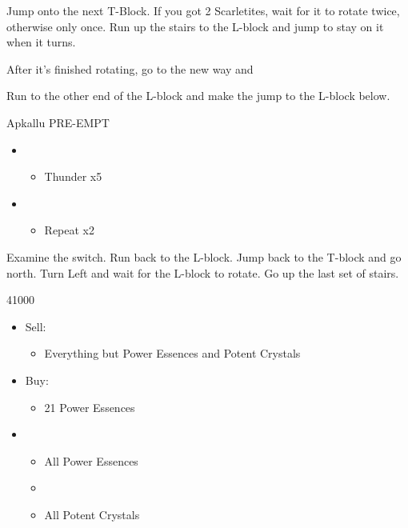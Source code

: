 Jump onto the next T-Block. If you got 2 Scarletites, wait for it to rotate twice, otherwise only once. Run up the stairs to the L-block and jump to stay on it when it turns.

After it's finished rotating, go to the new way and 

Run to the other end of the L-block and make the jump to the L-block below.

\begin{battle}{Apkallu PRE-EMPT}
	\begin{flushleft}
		\begin{itemize}
			\item \sixth
			      \begin{itemize}
				      \item Thunder x5
			      \end{itemize}
			\item \fifth
			      \begin{itemize}
				      \item Repeat x2
			      \end{itemize}
		\end{itemize}
	\end{flushleft}
\end{battle}

Examine the switch. Run back to the L-block. Jump back to the T-block and go north. Turn Left and wait for the L-block to rotate. Go up the last set of stairs.

\begin{shop}{41000}
	\begin{itemize}
		\item Sell:
		      \begin{itemize}
			      \item Everything but Power Essences and Potent Crystals
		      \end{itemize}
		\item Buy:
		      \begin{itemize}
			      \item 21 Power Essences
		      \end{itemize}
	\end{itemize}
\end{shop}
\begin{menu}
	\begin{itemize}
		\crystarium
		\begin{itemize}
			\item \chu
			      \begin{itemize}
				      \item All Power Essences
				      \item {}
				      \item All Potent Crystals
			      \end{itemize}
		\end{itemize}
	\end{itemize}
\end{menu}

